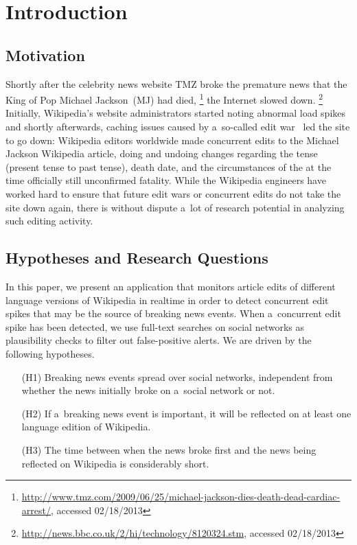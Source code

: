 \documentclass{sig-alternate}
\newcommand{\inlinelistingsize}{\fontsize{8pt}{11pt}}
\let\oldurl\url
\renewcommand{\url}[1]{\inlinelistingsize\oldurl{#1}}
\begin{document}



\section{Introduction}

\subsection{Motivation}

Shortly after the celebrity news website TMZ
broke the premature news that the King of Pop Michael Jackson~(MJ) had died,%
\footnote{\url{http://www.tmz.com/2009/06/25/michael-jackson-dies-death-dead-cardiac-arrest/},
accessed 02/18/2013}
the Internet slowed down.%
\footnote{\url{http://news.bbc.co.uk/2/hi/technology/8120324.stm}, accessed 02/18/2013}
Initially, Wikipedia's website administrators started noting abnormal load spikes~%
\cite{vibber2009currentevents} and shortly afterwards, caching issues
caused by a~so-called edit war~\cite{beaumont2009editwar} led the site to go down:
Wikipedia editors worldwide made concurrent edits
to the Michael Jackson Wikipedia article, doing and undoing changes
regarding the tense (present tense to past tense), death date,
and the circumstances of the at the time officially still unconfirmed fatality.
While the Wikipedia engineers have worked hard
to ensure that future edit wars or concurrent edits
do not take the site down again, there is without dispute a~lot of research potential
in analyzing such editing activity.

\subsection{Hypotheses and Research Questions}

In this paper, we present an application that monitors article edits
of different language versions of Wikipedia in realtime
in order to detect concurrent edit spikes that may be the source of
breaking news events.
When a~concurrent edit spike has been detected,
we use full-text searches on social networks
as plausibility checks to filter out false-positive alerts.
We are driven by the following hypotheses.

\begin{itemize}
  \itemsep0em
  \item[(H1)] Breaking news events spread over social networks,
    independent from whether the news initially broke on a~social network or not.
  \item[(H2)] If a~breaking news event is important, it will be reflected on
    at least one language edition of Wikipedia.
  \item[(H3)] The time between when the news broke first and the news
    being reflected on Wikipedia is considerably short.   
\end{itemize}
\end{document}
